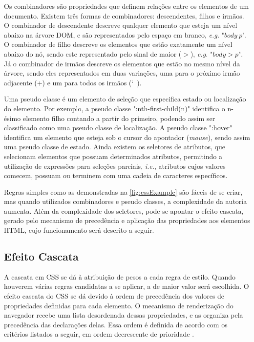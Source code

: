 Os combinadores são propriedades que definem relações entre os elementos de um documento. Existem três formas de combinadores: descendentes, filhos e irmãos. O combinador de descendente descreve qualquer elemento que esteja um nível abaixo na árvore DOM, e são representados pelo espaço em branco, \textit{e.g.} "$body\ p$". O combinador de filho descreve os elementos que estão exatamente um nível abaixo do nó, sendo este representado pelo sinal de maior ($>$), \textit{e.g.} "$body > p$". Já o combinador de irmãos descreve os elementos que estão no mesmo nível da árvore, sendo eles representados em duas variações, uma para o próximo irmão adjacente ($+$) e um para todos os irmãos (\char`~).

Uma pseudo classe é um elemento de seleção que especifica estado ou localização do elemento. Por exemplo, a pseudo classe ":nth-first-child(n)" identifica o n-ésimo elemento filho contando a partir do primeiro, podendo assim ser classificado como uma pseudo classe de localização. A pseudo classe ":hover" identifica um elemento que esteja sob o cursor do apontador (\textit{mouse}), sendo assim uma pseudo classe de estado. Ainda existem os seletores de atributos, que selecionam elementos que possuam determinados atributos, permitindo a utilização de expressões para seleções parciais, \textit{i.e.}, atributos cujos valores comecem, possuam ou terminem com uma cadeia de caracteres específicos.

Regras simples como as demonstradas na \autoref{fig:cssExample} são fáceis de se criar, mas quando utilizados combinadores e pseudo classes, a complexidade da autoria aumenta. Além da complexidade dos seletores, pode-se apontar o efeito cascata, gerado pelo mecanismo de precedência e aplicação das propriedades aos elementos HTML, cujo funcionamento será descrito a seguir.

\subsection{Efeito Cascata}
\label{subsec:cascade}

A cascata em CSS se dá à atribuição de pesos a cada regra de estilo. Quando houverem várias regras candidatas a se aplicar, a de maior valor será escolhida. O efeito cascata do CSS se dá devido à ordem de precedência dos valores de propriedades definidas para cada elemento. O mecanismo de renderização do navegador recebe uma lista desordenada dessas propriedades, e as organiza pela precedência das declarações delas. Essa ordem é definida de acordo com os critérios listados a seguir, em ordem decrescente de prioridade \cite{CSScascade2015}.

